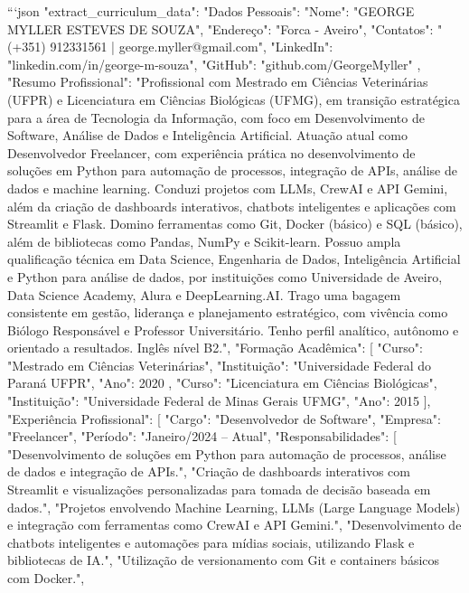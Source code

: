 ```json
{
  "extract_curriculum_data": {
    "Dados Pessoais": {
      "Nome": "GEORGE MYLLER ESTEVES DE SOUZA",
      "Endereço": "Forca - Aveiro",
      "Contatos": "(+351) 912331561 | george.myller@gmail.com",
      "LinkedIn": "linkedin.com/in/george-m-souza",
      "GitHub": "github.com/GeorgeMyller"
    },
    "Resumo Profissional": "Profissional com Mestrado em Ciências Veterinárias (UFPR) e Licenciatura em Ciências Biológicas (UFMG), em transição estratégica para a área de Tecnologia da Informação, com foco em Desenvolvimento de Software, Análise de Dados e Inteligência Artificial. Atuação atual como Desenvolvedor Freelancer, com experiência prática no desenvolvimento de soluções em Python para automação de processos, integração de APIs, análise de dados e machine learning. Conduzi projetos com LLMs, CrewAI e API Gemini, além da criação de dashboards interativos, chatbots inteligentes e aplicações com Streamlit e Flask. Domino ferramentas como Git, Docker (básico) e SQL (básico), além de bibliotecas como Pandas, NumPy e Scikit-learn. Possuo ampla qualificação técnica em Data Science, Engenharia de Dados, Inteligência Artificial e Python para análise de dados, por instituições como Universidade de Aveiro, Data Science Academy, Alura e DeepLearning.AI. Trago uma bagagem consistente em gestão, liderança e planejamento estratégico, com vivência como Biólogo Responsável e Professor Universitário. Tenho perfil analítico, autônomo e orientado a resultados. Inglês nível B2.",
    "Formação Acadêmica": [
      {
        "Curso": "Mestrado em Ciências Veterinárias",
        "Instituição": "Universidade Federal do Paraná UFPR",
        "Ano": 2020
      },
      {
        "Curso": "Licenciatura em Ciências Biológicas",
        "Instituição": "Universidade Federal de Minas Gerais UFMG",
        "Ano": 2015
      }
    ],
    "Experiência Profissional": [
      {
        "Cargo": "Desenvolvedor de Software",
        "Empresa": "Freelancer",
        "Período": "Janeiro/2024 – Atual",
        "Responsabilidades": [
          "Desenvolvimento de soluções em Python para automação de processos, análise de dados e integração de APIs.",
          "Criação de dashboards interativos com Streamlit e visualizações personalizadas para tomada de decisão baseada em dados.",
          "Projetos envolvendo Machine Learning, LLMs (Large Language Models) e integração com ferramentas como CrewAI e API Gemini.",
          "Desenvolvimento de chatbots inteligentes e automações para mídias sociais, utilizando Flask e bibliotecas de IA.",
          "Utilização de versionamento com Git e containers básicos com Docker.",
}}}
